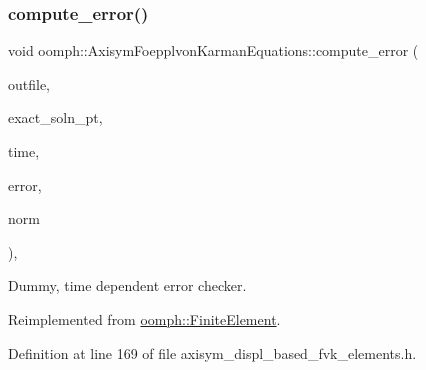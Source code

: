 \subsubsection{\texorpdfstring{compute\+\_\+error()}{compute\_error()}\hspace{0.1cm}{\footnotesize\ttfamily [4/4]}}
{\footnotesize\ttfamily void oomph\+::\+Axisym\+Foepplvon\+Karman\+Equations\+::compute\+\_\+error (\begin{DoxyParamCaption}\item[{std\+::ostream \&}]{outfile,  }\item[{\hyperlink{classoomph_1_1FiniteElement_ad4ecf2b61b158a4b4d351a60d23c633e}{Finite\+Element\+::\+Unsteady\+Exact\+Solution\+Fct\+Pt}}]{exact\+\_\+soln\+\_\+pt,  }\item[{const double \&}]{time,  }\item[{double \&}]{error,  }\item[{double \&}]{norm }\end{DoxyParamCaption})\hspace{0.3cm}{\ttfamily [inline]}, {\ttfamily [virtual]}}



Dummy, time dependent error checker. 



Reimplemented from \hyperlink{classoomph_1_1FiniteElement_a7f67853506dc73fa6b7505108de22d1f}{oomph\+::\+Finite\+Element}.



Definition at line 169 of file axisym\+\_\+displ\+\_\+based\+\_\+fvk\+\_\+elements.\+h.

\mbox{\label{classoomph_1_1AxisymFoepplvonKarmanEquations_a456a9c27c326d6d1e55e3ab822ac1a5f}} 
